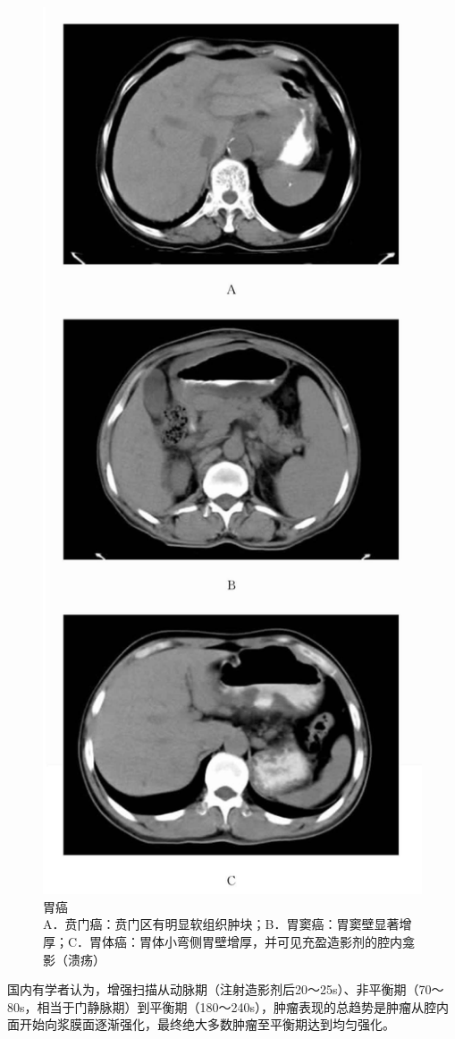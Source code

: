 \begin{figure}[!htbp]
 \centering
 \includegraphics[width=.7\textwidth,height=\textheight,keepaspectratio]{./images/Image00355.jpg}
 \captionsetup{justification=centering}
 \caption{胃癌\\{\small A．贲门癌：贲门区有明显软组织肿块；B．胃窦癌：胃窦壁显著增厚；C．胃体癌：胃体小弯侧胃壁增厚，并可见充盈造影剂的腔内龛影（溃疡）}}
 \label{fig17-4}
  \end{figure} 

国内有学者认为，增强扫描从动脉期（注射造影剂后20～25s）、非平衡期（70～80s，相当于门静脉期）到平衡期（180～240s），肿瘤表现的总趋势是肿瘤从腔内面开始向浆膜面逐渐强化，最终绝大多数肿瘤至平衡期达到均匀强化。

